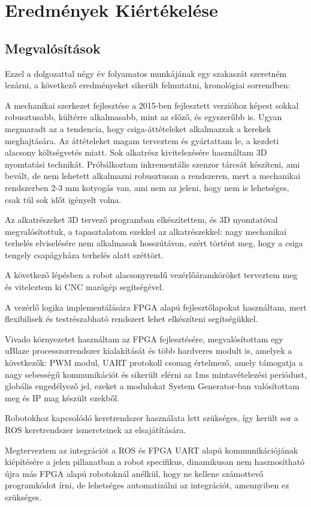 \chapter{Eredmények Kiértékelése}
\section{Megvalósítások}
Ezzel a dolgozattal négy év folyamatos munkájának egy szakaszát szeretném lezárni, a következő eredményeket sikerült felmutatni, kronológiai sorrendben: 

A mechanikai szerkezet fejlesztése a 2015-ben fejlesztett verzióhoz képest sokkal robusztusabb, kültérre alkalmasabb, mint az előző, és egyszerűbb is. Ugyan megmaradt az a tendencia, hogy csiga-áttételeket alkalmazzak a kerekek meghajtására. Az áttételeket magam terveztem és gyártattam le, a kezdeti alacsony költségvetés miatt. 
Sok alkatrész kivitelezésére használtam 3D nyomtatási technikát. Próbálkoztam inkrementális szenzor tárcsát készíteni, ami bevált, de nem lehetett alkalmazni robusztusan a rendszeren, mert a mechanikai rendszerben 2-3 mm kotyogás van, ami nem az jeleni, hogy nem is lehetséges, csak túl sok időt igényelt volna.

Az alkatrészeket 3D tervező programban elkészítettem, és 3D nyomtatóval megvalósítottuk, a tapasztalatom ezekkel az alkatrészekkel: nagy mechanikai terhelés elviselésére nem alkalmasak hosszútávon, ezért történt meg, hogy a csiga tengely csapágyháza terhelés alatt széttört.

A következő lépésben a robot alacsonyrendű vezérlőáramköröket terveztem meg és viteleztem ki CNC marógép segítségével.

A vezérlő logika implementálására FPGA alapú fejlesztőlapokat használtam, mert flexibilisek és testrészabható rendszert lehet elkészíteni segítségükkel.

Vivado környezetet használtam az FPGA fejlesztésére, megvalósítottam egy uBlaze processzorrendszer kialakítását és több hardveres modult is, amelyek a következők: PWM modul, UART protokoll csomag értelmező, amely támogatja a nagy sebességű kommunikációt és sikerült elérni  az 1ms mintavételezési periódust, globális engedélyező jel, ezeket a modulokat System Generator-ban valósítottam meg és IP mag készült ezekből.

Robotokhoz kapcsolódó keretrendszer használata lett szükséges, így került sor a ROS keretrendszer ismereteinek az elsajátítására.

Megterveztem az integrációt a ROS és FPGA UART alapú kommunikációjának kiépítésére a jelen pillanatban a robot specifikus, dinamikusan nem hasznosítható újra más FPGA alapú robotoknál anélkül, hogy ne kellene számottevő programkódot írni, de lehetséges automatizálni az integrációt, amennyiben ez szükséges.


